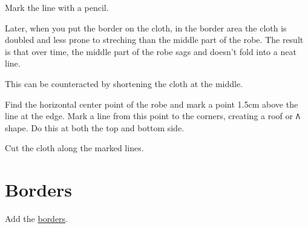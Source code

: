Mark the line with a pencil.

Later, when you put the border on the cloth, in the border area the
cloth is doubled and less prone to streching than the middle part of the
robe. The result is that over time, the middle part of the robe sags and
doesn't fold into a neat line.

This can be counteracted by shortening the cloth at the middle.

Find the horizontal center point of the robe and mark a point 1.5cm
above the line at the edge. Mark a line from this point to the corners,
creating a roof or \texttt{Λ} shape. Do this at both the top and bottom
side.


Cut the cloth along the marked lines.


\section{Borders}

Add the \href{/en/borders}{borders}.


